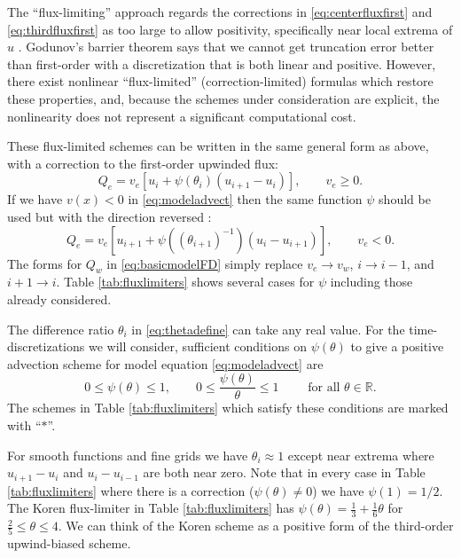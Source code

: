 \documentclass[11pt,final]{amsart}
\newcommand\RR{\mathbb{R}}
\begin{document}
The ``flux-limiting'' approach regards the corrections in \eqref{eq:centerfluxfirst} and \eqref{eq:thirdfluxfirst} as too large to allow positivity, specifically near local extrema of $u$ \citep[section III.1.1]{HundsdorferVerwer2010}.  Godunov's barrier theorem \citep[section I.7.1]{HundsdorferVerwer2010} says that we cannot get truncation error better than first-order with a discretization that is both linear and positive.  However, there exist nonlinear ``flux-limited'' (correction-limited) formulas which restore these properties, and, because the schemes under consideration are explicit, the nonlinearity does not represent a significant computational cost.

These flux-limited schemes can be written in the same general form as above, with a correction to the first-order upwinded flux:
\begin{equation}
Q_e = v_e \left[u_i + \psi(\theta_i) (u_{i+1} - u_i)\right], \qquad v_e \ge 0. \label{eq:fluxlimiterform}
\end{equation}
If we have $v(x)<0$ in \eqref{eq:modeladvect} then the same function $\psi$ should be used but with the direction reversed \citep[section III.1.1]{HundsdorferVerwer2010}:
\begin{equation}
Q_e = v_e \left[u_{i+1} + \psi\left((\theta_{i+1})^{-1}\right) (u_i - u_{i+1})\right], \qquad v_e < 0. \label{eq:fluxlimiterformreversed}
\end{equation}
The forms for $Q_w$ in \eqref{eq:basicmodelFD} simply replace $v_e \to v_w$, $i\to i-1$, and $i+1\to i$.  Table \ref{tab:fluxlimiters} shows several cases for $\psi$ including those already considered.

The difference ratio $\theta_i$ in \eqref{eq:thetadefine} can take any real value.  For the time-discretizations we will consider, sufficient conditions on $\psi(\theta)$ to give a positive advection scheme for model equation \eqref{eq:modeladvect} are
\begin{equation}
0 \le \psi(\theta) \le 1, \qquad 0 \le \frac{\psi(\theta)}{\theta} \le 1 \qquad \text{ for all } \theta \in \RR.
\end{equation}
The schemes in Table \ref{tab:fluxlimiters} which satisfy these conditions are marked with ``$\ast$''.

For smooth functions and fine grids we have $\theta_i\approx 1$ except near extrema where $u_{i+1} - u_i$ and $u_i - u_{i-1}$ are both near zero.  Note that in every case in Table \ref{tab:fluxlimiters} where there is a correction ($\psi(\theta)\ne 0$) we have $\psi(1)=1/2$.  The Koren flux-limiter in Table \ref{tab:fluxlimiters} \citep{HundsdorferVerwer2010} has $\psi(\theta) = \frac{1}{3}+\frac{1}{6} \theta$ for $\frac{2}{5} \le \theta \le 4$.  We can think of the Koren scheme as a positive form of the third-order upwind-biased scheme.
\end{document}
